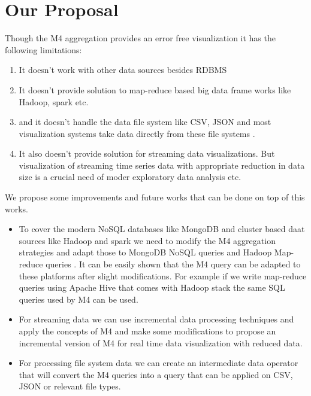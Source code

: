 \section{Our Proposal}
Though the M4 aggregation provides an error free visualization it has the following limitations:
\begin{enumerate}
	\item It doesn't work with other data sources besides RDBMS
	\item It doesn't provide solution to map-reduce based big data frame works like Hadoop, spark etc.
	\item and it doesn't handle the data file system like CSV, JSON and most visualization systems take data directly from these file systems \cite{bostock2011d3}.
	\item It also doesn't provide solution for streaming data visualizations. But visualization of streaming time series data with appropriate reduction in data size is a crucial need of moder exploratory data analysis etc.
\end{enumerate}
We propose some improvements and future works that can be done on top of this works.
\begin{itemize}
	\item To cover the modern NoSQL databases like MongoDB and cluster based daat sources like Hadoop and spark we need to modify the M4 aggregation strategies and adapt those to MongoDB NoSQL queries and Hadoop Map-reduce queries \cite{patel2012addressing}. It can be easily shown that the M4 query can be adapted to these platforms after slight modifications. For example if we write map-reduce queries using Apache Hive \cite{thusoo2009hive,barbierato2013modeling} that comes with Hadoop stack the same SQL queries used by M4 can be used.
	\item For streaming data we can use incremental data processing techniques \cite{de2015incremental,yan2012incmr} and apply the concepts of M4 and make some modifications to propose an incremental version of M4 for real time data visualization with reduced data.
	\item For processing file system data we can create an intermediate data operator that will convert the M4 queries into a query that can be applied on CSV, JSON or relevant file types.
\end{itemize}